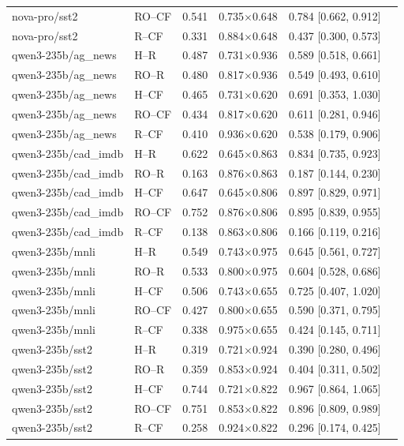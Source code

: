 \begin{table}[t]
\begin{tabular}{llrrrl}
nova-pro/sst2 & RO--CF & 0.541 & 0.735$\times$0.648 & 0.784 [0.662, 0.912] &  \\
nova-pro/sst2 & R--CF & 0.331 & 0.884$\times$0.648 & 0.437 [0.300, 0.573] &  \\
qwen3-235b/ag_news & H--R & 0.487 & 0.731$\times$0.936 & 0.589 [0.518, 0.661] &  \\
qwen3-235b/ag_news & RO--R & 0.480 & 0.817$\times$0.936 & 0.549 [0.493, 0.610] &  \\
qwen3-235b/ag_news & H--CF & 0.465 & 0.731$\times$0.620 & 0.691 [0.353, 1.030] &  \\
qwen3-235b/ag_news & RO--CF & 0.434 & 0.817$\times$0.620 & 0.611 [0.281, 0.946] &  \\
qwen3-235b/ag_news & R--CF & 0.410 & 0.936$\times$0.620 & 0.538 [0.179, 0.906] &  \\
qwen3-235b/cad_imdb & H--R & 0.622 & 0.645$\times$0.863 & 0.834 [0.735, 0.923] &  \\
qwen3-235b/cad_imdb & RO--R & 0.163 & 0.876$\times$0.863 & 0.187 [0.144, 0.230] &  \\
qwen3-235b/cad_imdb & H--CF & 0.647 & 0.645$\times$0.806 & 0.897 [0.829, 0.971] &  \\
qwen3-235b/cad_imdb & RO--CF & 0.752 & 0.876$\times$0.806 & 0.895 [0.839, 0.955] &  \\
qwen3-235b/cad_imdb & R--CF & 0.138 & 0.863$\times$0.806 & 0.166 [0.119, 0.216] &  \\
qwen3-235b/mnli & H--R & 0.549 & 0.743$\times$0.975 & 0.645 [0.561, 0.727] &  \\
qwen3-235b/mnli & RO--R & 0.533 & 0.800$\times$0.975 & 0.604 [0.528, 0.686] &  \\
qwen3-235b/mnli & H--CF & 0.506 & 0.743$\times$0.655 & 0.725 [0.407, 1.020] &  \\
qwen3-235b/mnli & RO--CF & 0.427 & 0.800$\times$0.655 & 0.590 [0.371, 0.795] &  \\
qwen3-235b/mnli & R--CF & 0.338 & 0.975$\times$0.655 & 0.424 [0.145, 0.711] &  \\
qwen3-235b/sst2 & H--R & 0.319 & 0.721$\times$0.924 & 0.390 [0.280, 0.496] &  \\
qwen3-235b/sst2 & RO--R & 0.359 & 0.853$\times$0.924 & 0.404 [0.311, 0.502] &  \\
qwen3-235b/sst2 & H--CF & 0.744 & 0.721$\times$0.822 & 0.967 [0.864, 1.065] &  \\
qwen3-235b/sst2 & RO--CF & 0.751 & 0.853$\times$0.822 & 0.896 [0.809, 0.989] &  \\
qwen3-235b/sst2 & R--CF & 0.258 & 0.924$\times$0.822 & 0.296 [0.174, 0.425] &  \\
\bottomrule
\end{tabular}
\end{table}
